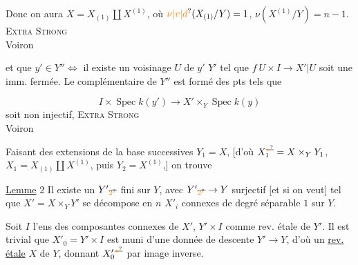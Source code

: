 Donc on aura $X=X_{(1)}\amalg X^{(1)}$, où $\unsure{\nu|v|d}(X_{(1)}/Y)=1$, $\nu(X^{(1)}/Y)=n-1$.
\textsc{Extra Strong}\\
 Voiron

et que $y'\in Y''\iff$ il existe un voisinage $U$ de $y'$  $Y'$ tel que $f\ U\times I\to X'|U$ soit une  imm. fermée. Le complémentaire de $Y''$ est formé des pts tels que

\[
I\times\operatorname{Spec}k(y')\longrightarrow X'\times_Y\operatorname{Spec}k(y)
\]
soit  non injectif,
\textsc{Extra Strong}\\
 Voiron

Faisant des extensions de la base successives $Y_1=X$, [d'où $X_1^{\deleted{\unsure{*}}}=X\times_Y Y_1$, $X_1=X_{(1)}\amalg X^{(1)}$, puis $Y_2=X^{(1)}$,] on trouve

\uline{Lemme} 2 Il existe un $Y'\deleted{_{\unsure{2}}}$  fini sur $Y$, avec $Y'\deleted{_{\unsure{2}}}\to Y$ surjectif [et   si on veut] tel que $X'=X\times_Y Y'$ se décompose en $n$  $X'_i$ connexes de degré  séparable $1$ sur $Y$.

Soit $I$ l'ens des composantes connexes de $X'$,  $Y'\times I$ comme rev. étale de $Y'$. Il est trivial que $X'_0=Y'\times I$ est muni d'une donnée de descente  $Y'\to Y$, d'où un \uline{rev.} \uline{étale} $X$ de $Y$, donnant $X'_0{}^{\deleted{\unsure{*}}}$ par image inverse.


